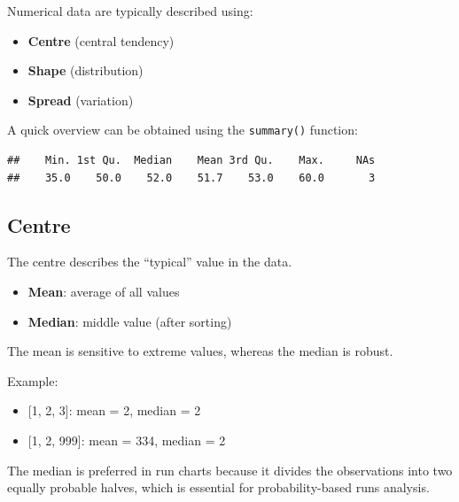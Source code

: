 \documentclass[
]{book}
\newenvironment{Shaded}{\begin{snugshade}}{\end{snugshade}}
\newcommand{\CommentTok}[1]{\textcolor[rgb]{0.56,0.35,0.01}{\textit{#1}}}
\newcommand{\FunctionTok}[1]{\textcolor[rgb]{0.13,0.29,0.53}{\textbf{#1}}}
\newcommand{\NormalTok}[1]{#1}
\newcommand{\SpecialCharTok}[1]{\textcolor[rgb]{0.81,0.36,0.00}{\textbf{#1}}}
\providecommand{\tightlist}{%
  \setlength{\itemsep}{0pt}\setlength{\parskip}{0pt}}
\begin{document}
Numerical data are typically described using:

\begin{itemize}
\tightlist
\item
  \textbf{Centre} (central tendency)
\item
  \textbf{Shape} (distribution)
\item
  \textbf{Spread} (variation)
\end{itemize}

A quick overview can be obtained using the \texttt{summary()} function:

\begin{Shaded}
\end{Shaded}

\begin{verbatim}
##    Min. 1st Qu.  Median    Mean 3rd Qu.    Max.     NAs 
##    35.0    50.0    52.0    51.7    53.0    60.0       3
\end{verbatim}

\subsection{Centre}\label{centre}

The centre describes the ``typical'' value in the data.

\begin{itemize}
\tightlist
\item
  \textbf{Mean}: average of all values
\item
  \textbf{Median}: middle value (after sorting)
\end{itemize}

The mean is sensitive to extreme values, whereas the median is robust.

Example:

\begin{itemize}
\tightlist
\item
  {[}1, 2, 3{]}: mean = 2, median = 2
\item
  {[}1, 2, 999{]}: mean = 334, median = 2
\end{itemize}

The median is preferred in run charts because it divides the observations into two equally probable halves, which is essential for probability-based runs analysis.
\end{document}
